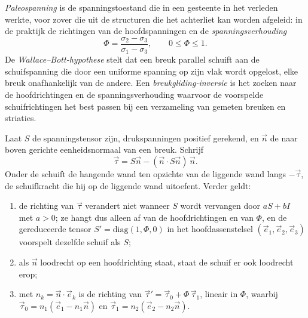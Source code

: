 \begin{definition}\label{def:b3:structural-analysis:palaeostress}
\emph{Paleospanning} is de spanningstoestand die in
een gesteente in het verleden werkte, voor zover die uit de structuren die het achterliet kan worden afgeleid:
in de praktijk de richtingen van de hoofdspanningen en de
\emph{spanningsverhouding}
\[
  \Phi = \frac{\sigma_2 - \sigma_3}{\sigma_1 - \sigma_3}, \qquad 0 \le \Phi
  \le 1 .
\]
De \emph{Wallace--Bott-hypothese} stelt
dat een breuk parallel schuift aan de schuifspanning die door een
uniforme spanning op zijn vlak wordt opgelost, elke breuk onafhankelijk van de andere. Een
\emph{breukgliding-inversie} is het zoeken naar de hoofdrichtingen en de
spanningsverhouding waarvoor de voorspelde schuifrichtingen het best passen bij een verzameling
van gemeten breuken en striaties.
\end{definition}

\begin{theorem}\label{thm:b3:structural-analysis:wallace-bott}
Laat $S$ de spanningstensor zijn, drukspanningen positief gerekend, en $\vec n$ de
naar boven gerichte eenheidsnormaal van een breuk. Schrijf
\[
  \vec\tau = S\vec n - (\vec n\cdot S\vec n)\,\vec n .
\]
Onder de  schuift de hangende wand ten opzichte van de
liggende wand langs $-\vec\tau$, de schuifkracht die hij op de
liggende wand uitoefent. Verder geldt:
\begin{enumerate}[label=(\alph*)]
  \item de richting van $\vec\tau$ verandert niet wanneer $S$ wordt vervangen door $aS +
        bI$ met $a > 0$; ze hangt dus alleen af van de hoofdrichtingen en van $\Phi$, en de
        gereduceerde tensor $S' =
        \mathrm{diag}(1, \Phi, 0)$ in het hoofdassenstelsel $(\vec e_1, \vec
        e_2, \vec e_3)$ voorspelt dezelfde schuif als $S$;
  \item als $\vec n$ loodrecht op een hoofdrichting staat, staat de schuif er ook
        loodrecht erop;
  \item met $n_k = \vec n\cdot\vec e_k$ is de richting van $\vec\tau'
        = \vec\tau_0 + \Phi\,\vec\tau_1$, lineair in $\Phi$, waarbij $\vec\tau_0
        = n_1(\vec e_1 - n_1\vec n)$ en $\vec\tau_1 = n_2(\vec e_2 - n_2\vec
        n)$.
\end{enumerate}
\end{theorem}

